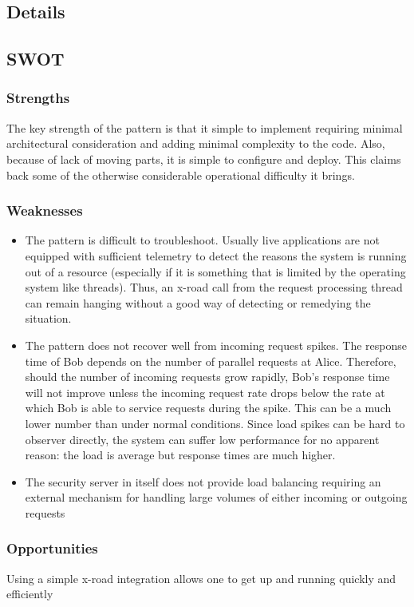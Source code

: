 \documentclass[10pt,a4paper]{article}
\begin{document}
\subsection{Details}

\subsection{SWOT}
\subsubsection{Strengths}
The key strength of the pattern is that it simple to implement requiring minimal architectural consideration and adding minimal complexity to the code. Also, because of lack of moving parts, it is simple to configure and deploy. This claims back some of the otherwise considerable operational difficulty it brings.

\subsubsection{Weaknesses}
\begin{itemize}
	\item The pattern is difficult to troubleshoot. Usually live applications are not equipped with sufficient telemetry to detect the reasons the system is running out of a resource (especially if it is something that is limited by the operating system like threads). Thus, an x-road call from the request processing thread can remain hanging without a good way of detecting or remedying the situation.
	\item The pattern does not recover well from incoming request spikes. The response time of Bob depends on the number of parallel requests at Alice. Therefore, should the number of incoming requests grow rapidly, Bob's response time will not improve unless the incoming request rate drops below the rate at which Bob is able to service requests during the spike. This can be a much lower number than under normal conditions. Since load spikes can be hard to observer directly, the system can suffer low performance for no apparent reason: the load is average but response times are much higher. 
	\item The security server in itself does not provide load balancing requiring an external mechanism for handling large volumes of either incoming or outgoing requests
\end{itemize}
	
\subsubsection{Opportunities}
Using a simple x-road integration allows one to get up and running quickly and efficiently
\end{document}
